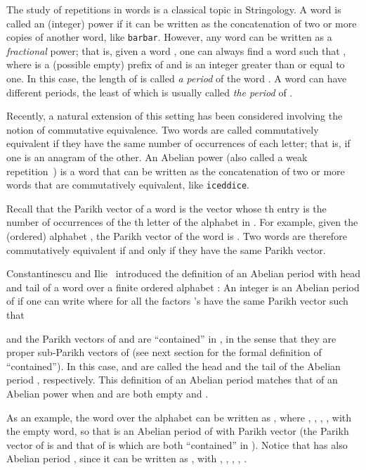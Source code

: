\documentclass[3p]{elsarticle}
\def\sa#1{\mbox{\tt #1}}
\begin{document}
The study of repetitions in words is a classical topic in Stringology. A word is called an (integer) power if it can be written as the concatenation of two or more copies of another word, like \sa{barbar}. However, any word can be written as a \emph{fractional} power; that is, given a word , one can always find a word  such that , where  is a (possible empty) prefix of  and  is an integer greater than or equal to one. In this case, the length of  is called \emph{a period} of the word . A word  can have different periods, the least of which is usually called \emph{the period} of .

Recently, a natural extension of this setting has been considered involving the notion of commutative equivalence. Two words are called commutatively equivalent if they have the same number of occurrences of each letter; that is, if one is an anagram of the other. An Abelian power (also called a weak repetition~\cite{Cummings_weakrepetitions}) is a word that can be written as the concatenation of two or more words that are commutatively equivalent, like  \sa{iceddice}.

Recall that the Parikh vector  of a word  is the vector whose th entry is the 
 number of occurrences of the th letter of the alphabet in . 
 For example, given the (ordered) alphabet , the Parikh vector
 of the word  is . Two words are therefore commutatively equivalent if and only if they have the same Parikh vector.

Constantinescu and Ilie~\cite{CI2006} introduced the definition of an Abelian period with head and tail of a word  over a
 finite ordered alphabet : An integer  is an Abelian period of   if one can write
  where for 
 all the factors 's have the same Parikh vector  such that
 
 and the Parikh vectors of  and  are ``contained''
 in , in the sense that they are proper sub-Parikh vectors of  (see next section for the formal definition of ``contained''). In this case,  and  are called the head and the tail of the Abelian period , respectively. 
This definition of an Abelian period matches that of an
Abelian power when  and  are both  empty  and
 .
 
 As an example, the word  over the alphabet  can be written as
 , where
 , , , , with  the empty word,
 so that  is an Abelian period of  with Parikh vector 
 (the Parikh vector of  is  and that of 
 is  which are both ``contained'' in ). Notice that  has also Abelian period , since it can be written as , with , , , , .
\end{document}
